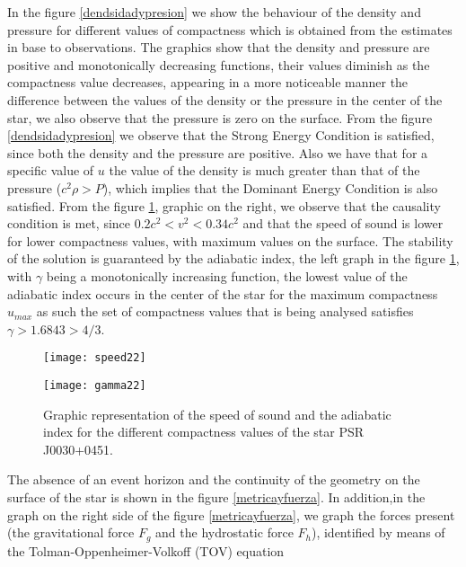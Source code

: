 \documentclass[12pt,onecolumn,a4paper]{article}
\begin{document}
\noindent
In the figure \ref{dendsidadypresion} we show the behaviour of the density and pressure for different values of compactness which is obtained from the estimates in base to observations. The graphics show that the density and pressure are positive and monotonically decreasing functions, their values diminish as the compactness value decreases, appearing in a more noticeable manner the difference between the values of the density or the pressure in the center of the star, we also observe that the pressure is zero on the surface. From the figure \ref{dendsidadypresion} we observe that the Strong Energy Condition is satisfied, since both the density and the pressure are positive. Also we have that for a specific value of $u$ the value of the density is much greater than that of the pressure ($c^2\rho>P$), which implies that the Dominant Energy Condition is also satisfied. 
From the figure \ref{velocidadeindice}, graphic on the right, we observe that the causality condition is met, since $0.2 c^2<v^2<0.34 c^2$ and that the speed of sound is lower for lower compactness values, with maximum values on the surface. The stability of the solution is guaranteed by the adiabatic index, the left graph in the figure \ref{velocidadeindice}, with $\gamma$ being a monotonically increasing function, the lowest value of the adiabatic index occurs in the center of the star for the maximum compactness $u_{max}$ as such the set of compactness values that is being analysed satisfies $\gamma>1.6843>4/3$. 
\begin{figure}[htb!]
\begin{minipage}[t]{0.43\linewidth}
\centering
\texttt{[image: speed22]}
\end{minipage}
\hspace{0.9cm} 
\begin{minipage}[t]{0.43\linewidth}
\centering
\texttt{[image: gamma22]}
\end{minipage}
\caption{Graphic representation of the speed of sound and the adiabatic index for the different compactness values of the star PSR J0030+0451.}
\label{velocidadeindice}
\end{figure}
The absence of an event horizon and the continuity of the geometry on the surface of the star is shown in the figure  \ref{metricayfuerza}. In addition,in the graph on the right side of the figure \ref{metricayfuerza}, we graph the forces present (the gravitational force $F_g$ and the hydrostatic force $F_h$), identified by means of the Tolman-Oppenheimer-Volkoff (TOV) equation 
\end{document}
